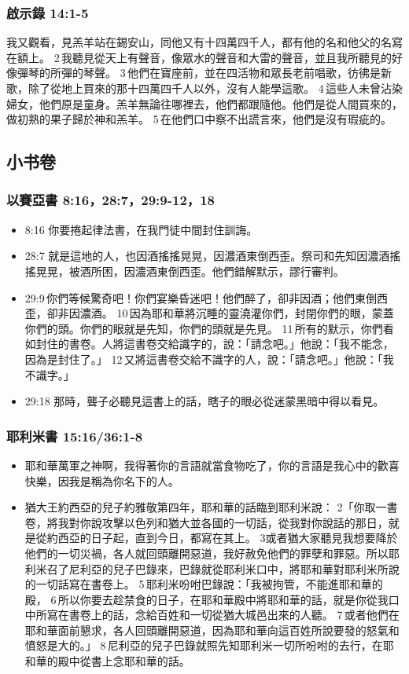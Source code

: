 \subsubsection{啟示錄 14:1-5 }
我又觀看，見羔羊站在錫安山，同他又有十四萬四千人，都有他的名和他父的名寫在額上。 2 我聽見從天上有聲音，像眾水的聲音和大雷的聲音，並且我所聽見的好像彈琴的所彈的琴聲。 3 他們在寶座前，並在四活物和眾長老前唱歌，彷彿是新歌，除了從地上買來的那十四萬四千人以外，沒有人能學這歌。 4 這些人未曾沾染婦女，他們原是童身。羔羊無論往哪裡去，他們都跟隨他。他們是從人間買來的，做初熟的果子歸於神和羔羊。 5 在他們口中察不出謊言來，他們是沒有瑕疵的。

\subsection{小书卷}

\subsubsection{以賽亞書 8:16，28:7，29:9-12，18}
\begin{itemize}
\itemsep-.25em
\item 8:16 你要捲起律法書，在我門徒中間封住訓誨。
\item 28:7 就是這地的人，也因酒搖搖晃晃，因濃酒東倒西歪。祭司和先知因濃酒搖搖晃晃，被酒所困，因濃酒東倒西歪。他們錯解默示，謬行審判。
\item 29:9 你們等候驚奇吧！你們宴樂昏迷吧！他們醉了，卻非因酒；他們東倒西歪，卻非因濃酒。 10 因為耶和華將沉睡的靈澆灌你們，封閉你們的眼，蒙蓋你們的頭。你們的眼就是先知，你們的頭就是先見。 11 所有的默示，你們看如封住的書卷。人將這書卷交給識字的，說：「請念吧。」他說：「我不能念，因為是封住了。」 12 又將這書卷交給不識字的人，說：「請念吧。」他說：「我不識字。」
\item 29:18 那時，聾子必聽見這書上的話，瞎子的眼必從迷蒙黑暗中得以看見。
\end{itemize}

\subsubsection{耶利米書 15:16/36:1-8}
\begin{itemize}
\itemsep-.25em
\item 耶和華萬軍之神啊，我得著你的言語就當食物吃了，你的言語是我心中的歡喜快樂，因我是稱為你名下的人。
\item 猶大王約西亞的兒子約雅敬第四年，耶和華的話臨到耶利米說： 2「你取一書卷，將我對你說攻擊以色列和猶大並各國的一切話，從我對你說話的那日，就是從約西亞的日子起，直到今日，都寫在其上。 3或者猶大家聽見我想要降於他們的一切災禍，各人就回頭離開惡道，我好赦免他們的罪孽和罪惡。所以耶利米召了尼利亞的兒子巴錄來，巴錄就從耶利米口中，將耶和華對耶利米所說的一切話寫在書卷上。 5 耶利米吩咐巴錄說：「我被拘管，不能進耶和華的殿， 6 所以你要去趁禁食的日子，在耶和華殿中將耶和華的話，就是你從我口中所寫在書卷上的話，念給百姓和一切從猶大城邑出來的人聽。 7 或者他們在耶和華面前懇求，各人回頭離開惡道，因為耶和華向這百姓所說要發的怒氣和憤怒是大的。」 8 尼利亞的兒子巴錄就照先知耶利米一切所吩咐的去行，在耶和華的殿中從書上念耶和華的話。
\end{itemize}

